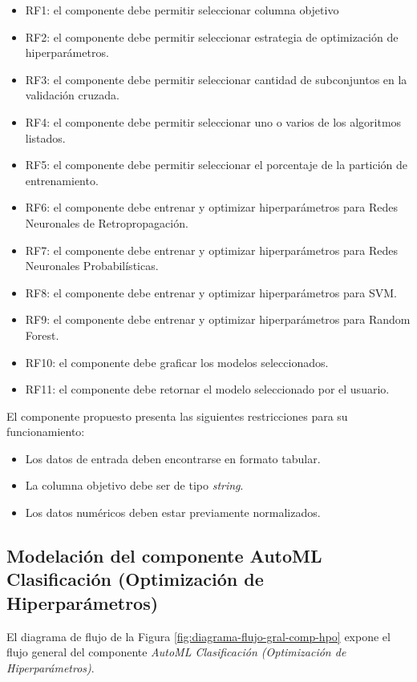 \begin{itemize}
	\item RF1: el componente debe permitir seleccionar columna objetivo
	\item RF2: el componente debe permitir seleccionar estrategia de optimización de hiperparámetros.
	\item RF3: el componente debe permitir seleccionar cantidad de subconjuntos en la validación cruzada.
	\item RF4: el componente debe permitir seleccionar uno o varios de los algoritmos listados.
	\item RF5: el componente debe permitir seleccionar el porcentaje de la partición de entrenamiento.
	\item RF6: el componente debe entrenar y optimizar hiperparámetros para Redes Neuronales de Retropropagación. 
	\item RF7: el componente debe entrenar y optimizar hiperparámetros para Redes Neuronales Probabilísticas. 
	\item RF8: el componente debe entrenar y optimizar hiperparámetros para SVM.
	\item RF9: el componente debe entrenar y optimizar hiperparámetros para Random Forest.
	\item RF10: el componente debe graficar los modelos seleccionados.
	\item RF11: el componente debe retornar el modelo seleccionado por el usuario.
\end{itemize}

El componente propuesto presenta las siguientes restricciones para su funcionamiento:

\begin{itemize}
	\item Los datos de entrada deben encontrarse en formato tabular.
	\item La columna objetivo debe ser de tipo \textit{string}.
	\item Los datos numéricos deben estar previamente normalizados.
\end{itemize}

\subsection{Modelación del componente AutoML Clasificación (Optimización de Hiperparámetros)}
El diagrama de flujo de la Figura \ref{fig:diagrama-flujo-gral-comp-hpo} expone el flujo general del componente \textit{AutoML Clasificación (Optimización de Hiperparámetros)}.

